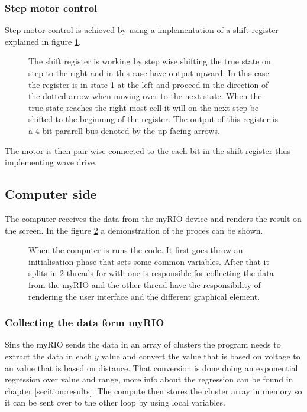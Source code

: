 \subsubsection{Step motor control}\label{subsubsection:Step-control}
Step motor control is achieved by using a implementation of a shift register explained in figure \ref{fig:shift-reg}. 

\begin{figure}[ht]
  \centering
  
  \caption{The shift register is working by step wise shifting the true state on step to the right and in this case have output upward. In this case the register is in state 1 at the left and proceed in the direction of the dotted arrow when moving over to the next state. When the true state reaches the right most cell it will on the next step be shifted to the beginning of the register. The output of this register is a 4 bit pararell bus denoted by the up facing arrows.}
  \label{fig:shift-reg}
\end{figure}
The motor is then pair wise connected to the each bit in the shift register thus implementing wave drive.

\subsection{Computer side}\label{subsection:computer-side}
The computer receives the data from the myRIO device and renders the result on the screen. In the figure \ref{fig:data-recive} a demonstration of the proces can be shown.

\begin{figure}[ht]
    \centering
   
  \caption{When the computer is runs the code. It first goes throw an initialisation phase that sets some common variables. After that it splits in 2 threads for with one is responsible for collecting the data from the myRIO and the other thread have the responsibility of rendering the user interface and the different graphical element.}
  \label{fig:data-recive}
\end{figure}

\subsubsection{Collecting the data form myRIO}\label{subsubsection:collectData}
Sins the myRIO sends the data in an array of clusters the program needs to extract the data in each $y$ value and convert the value that is based on voltage to an value that is based on distance. That conversion is done doing an exponential regression over value and range, more info about the regression can be found in chapter \ref{secition:results}. The compute then stores the cluster array in memory so it can be sent over to the other loop by using local variables. 

